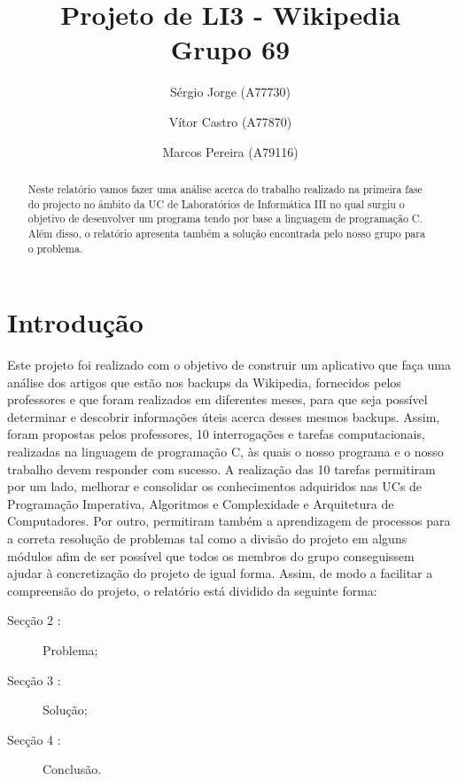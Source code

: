 \documentclass[a4paper]{article}
\title{Projeto de LI3 - Wikipedia\\Grupo 69}
\author{Sérgio Jorge (A77730) \and Vítor Castro (A77870) \and Marcos Pereira (A79116)}
\begin{document}
\maketitle

\begin{abstract}
Neste relatório vamos fazer uma análise acerca do trabalho realizado na primeira fase do projecto no âmbito da UC de Laboratórios de Informática III no qual surgiu o objetivo de desenvolver um programa tendo por base a linguagem de programação C. Além disso, o relatório apresenta também a solução encontrada pelo nosso grupo para o problema.
\end{abstract}

\tableofcontents

\section{Introdução}
\label{sec:intro}

Este projeto foi realizado com o objetivo de construir um aplicativo que faça uma análise dos artigos que estão nos backups da Wikipedia, fornecidos pelos professores e que foram realizados em diferentes meses, para que seja possível determinar e descobrir informações úteis acerca desses mesmos backups.
Assim, foram propostas pelos professores, 10 interrogações e tarefas computacionais, realizadas na linguagem de programação C, às quais o nosso programa e o nosso trabalho devem responder com sucesso. A realização das 10 tarefas permitiram por um lado, melhorar e consolidar os conhecimentos adquiridos nas UCs de Programação Imperativa, Algoritmos e Complexidade e Arquitetura de Computadores. Por outro, permitiram também a aprendizagem de processos para a correta resolução de problemas tal como a divisão do projeto em alguns módulos afim de ser possível que todos os membros do grupo conseguissem ajudar à concretização do projeto de igual forma.
Assim, de modo a facilitar a compreensão do projeto, o relatório está dividido da seguinte forma:
\begin{description}
    \item[Secção 2 :] Problema;
    \item[Secção 3 :] Solução;
    \item[Secção 4 :] Conclusão.
\end{description}
\end{document}
